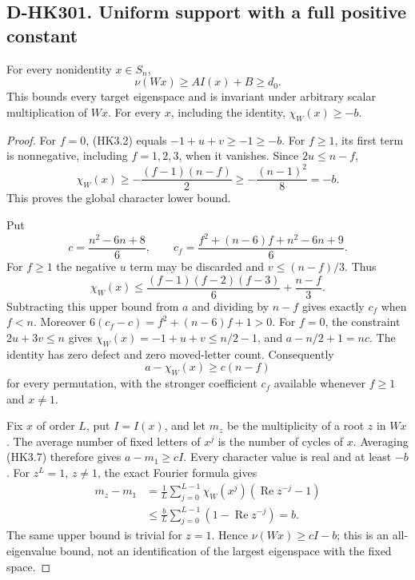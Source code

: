 \subsection*{D-HK301. Uniform support with a full positive constant}

\begin{lemma}[D-HK301]
For every nonidentity $x\in S_n$,
\[
                  \nu(Wx)\ge A I(x)+B\ge d_0.
 \tag{HK3.3}
\]
This bounds every target eigenspace and is invariant under
arbitrary scalar multiplication of $Wx$.  For every $x$,
including the identity, $\chi_W(x)\ge-b$.
\end{lemma}

\begin{proof}
For $f=0$, (HK3.2) equals $-1+u+v\ge-1\ge-b$.
For $f\ge1$, its first term is nonnegative, including
$f=1,2,3$, when it vanishes.  Since $2u\le n-f$,
\[
 \chi_W(x)\ge-\frac{(f-1)(n-f)}2
             \ge-\frac{(n-1)^2}{8}=-b.
 \tag{HK3.4}
\]
This proves the global character lower bound.

Put
\[
 c=\frac{n^2-6n+8}{6},\qquad
 c_f=\frac{f^2+(n-6)f+n^2-6n+9}{6}.
 \tag{HK3.5}
\]
For $f\ge1$ the negative $u$ term may be discarded and
$v\le(n-f)/3$.  Thus
\[
 \chi_W(x)\le\frac{(f-1)(f-2)(f-3)}6+\frac{n-f}{3}.
 \tag{HK3.6}
\]
Subtracting this upper bound from $a$ and dividing by
$n-f$ gives exactly $c_f$ when $f<n$.
Moreover $6(c_f-c)=f^2+(n-6)f+1>0$.
For $f=0$, the constraint $2u+3v\le n$ gives
$\chi_W(x)=-1+u+v\le n/2-1$, and
$a-n/2+1=nc$.  The identity has zero defect and zero
moved-letter count.  Consequently
\[
                    a-\chi_W(x)\ge c(n-f)
 \tag{HK3.7}
\]
for every permutation, with the stronger coefficient $c_f$
available whenever $f\ge1$ and $x\ne1$.

Fix $x$ of order $L$, put $I=I(x)$, and let $m_z$ be
the multiplicity of a root $z$ in $Wx$.  The average number
of fixed letters of $x^j$ is the number of cycles of $x$.
Averaging (HK3.7) therefore gives $a-m_1\ge cI$.
Every character value is real and at least $-b$.
For $z^L=1$, $z\ne1$, the exact Fourier formula gives
\[
 \begin{split}
 m_z-m_1
 &=\frac1L\sum_{j=0}^{L-1}
       \chi_W(x^j)(\operatorname{Re}z^{-j}-1)\\
 &\le\frac bL\sum_{j=0}^{L-1}(1-\operatorname{Re}z^{-j})=b.
 \end{split}
 \tag{HK3.8}
\]
The same upper bound is trivial for $z=1$.
Hence $\nu(Wx)\ge cI-b$; this is an all-eigenvalue bound,
not an identification of the largest eigenspace with the fixed space.


\end{proof}
